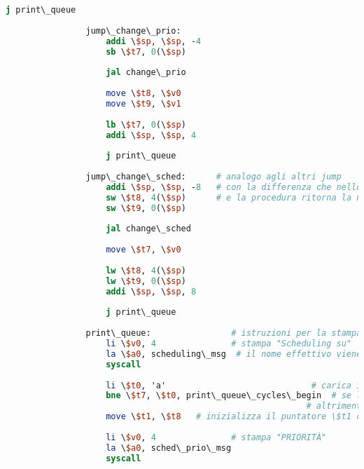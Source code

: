 \begin{center}
\begin{lstlisting}[language=mips, gobble=14, stepnumber=1]
                    j print\_queue
                    
                jump\_change\_prio:
                    addi \$sp, \$sp, -4
                    sb \$t7, 0(\$sp)
                    
                    jal change\_prio
                    
                    move \$t8, \$v0
                    move \$t9, \$v1
                    
                    lb \$t7, 0(\$sp)
                    addi \$sp, \$sp, 4
                    
                    j print\_queue
                    
                jump\_change\_sched:      # analogo agli altri jump
                    addi \$sp, \$sp, -8   # con la differenza che nello stack si salvano i due puntatori
                    sw \$t8, 4(\$sp)      # e la procedura ritorna la nuova politica di scheduling
                    sw \$t9, 0(\$sp)
                    
                    jal change\_sched
                    
                    move \$t7, \$v0
                    
                    lw \$t8, 4(\$sp)
                    lw \$t9, 0(\$sp)
                    addi \$sp, \$sp, 8
                    
                    j print\_queue
                    
                print\_queue:                # istruzioni per la stampa della coda
                    li \$v0, 4               # stampa "Scheduling su"
                    la \$a0, scheduling\_msg  # il nome effettivo viene poi stampato a seconda dello scheduling attuale
                    syscall
                
                    li \$t0, 'a'                             # carica il carattere 'a', per poterlo comparare con la politica attuale
                    bne \$t7, \$t0, print\_queue\_cycles\_begin  # se la politica non è A, esegui l'inizializzazione per la politica B
                                                            # altrimenti
                    move \$t1, \$t8   # inizializza il puntatore \$t1 col puntatore di A
                    
                    li \$v0, 4               # stampa "PRIORITÀ"
                    la \$a0, sched\_prio\_msg
                    syscall
                    

\end{lstlisting}
\end{center}
